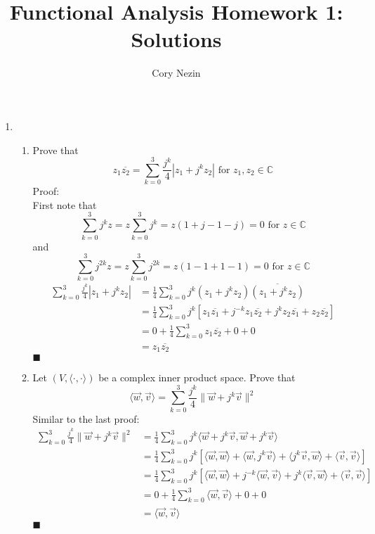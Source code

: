 \documentclass[12pt]{article}
\title{Functional Analysis Homework 1: Solutions}
\author{Cory Nezin}
\begin{document}
\maketitle
\begin{enumerate}
\item
\begin{enumerate}
\item Prove that
$$ z_1\overline{z_2} = \sum_{k=0}^3 \frac{j^k}{4}|z_1 + j^kz_2| \text{ for } 
z_1,z_2 \in \mathbb{C}$$
Proof:\\
First note that 
$$\sum_{k=0}^3 j^k z = z\sum_{k=0}^3j^k = z(1 + j -1 -j) = 0 \text{ for } z \in \mathbb{C}$$
and
$$\sum_{k=0}^3 j^{2k} z = z\sum_{k=0}^3j^{2k} = z(1 -1 +1 -1) = 0 \text{ for } z \in \mathbb{C}$$
\begin{align*}
\sum_{k=0}^3 \frac{j^k}{4}|z_1 + j^kz_2| &= \frac{1}{4}\sum_{k=0}^3 j^k (z_1+j^kz_2)\overline{(z_1+j^kz_2)}\\
&= \frac{1}{4}\sum_{k=0}^3 j^k [z_1\overline{z_1} + j^{-k}z_1\overline{z_2} + j^kz_2\overline{z_1} + z_2\overline{z_2}]\\
&= 0 + \frac{1}{4}\sum_{k=0}^3 z_1\overline{z_2} + 0 + 0\\
&= z_1\overline{z_2}
\end{align*}
$\blacksquare$
\item Let $(V,\langle\cdot,\cdot\rangle)$ be a complex inner product space.  Prove that\\
$$\langle \vec{w},\vec{v}\rangle = \sum_{k=0}^3 \frac{j^k}{4} \lVert \vec{w} + 
j^k\vec{v}\rVert^2$$
Similar to the last proof:
\begin{align*}
\sum_{k=0}^3 \frac{j^k}{4}\lVert \vec{w} + j^k\vec{v}\rVert^2 &= \frac{1}{4}\sum_{k=0}^3 j^k \langle \vec{w}+j^k\vec{v},\vec{w}+j^k\vec{v}\rangle\\
&= \frac{1}{4}\sum_{k=0}^3 j^k [\langle \vec{w},\vec{w} \rangle + \langle \vec{w},j^k\vec{v} \rangle + \langle j^k\vec{v},\vec{w} \rangle + \langle \vec{v}, \vec{v} \rangle]\\
&= \frac{1}{4}\sum_{k=0}^3 j^k [\langle \vec{w},\vec{w} \rangle + j^{-k}\langle \vec{w},\vec{v} \rangle + j^k \langle \vec{v},\vec{w} \rangle + \langle \vec{v}, \vec{v} \rangle]\\
&= 0 + \frac{1}{4}\sum_{k=0}^3 \langle \vec{w},\vec{v} \rangle + 0 + 0\\
&= \langle \vec{w},\vec{v} \rangle
\end{align*}
$\blacksquare$
\end{enumerate}
\end{enumerate}
\end{document}
